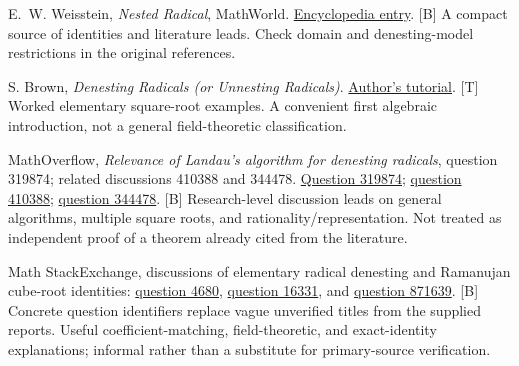 \documentclass[11pt,a4paper]{article}
\numberwithin{equation}{section}
\theoremstyle{definition}\newtheorem{definition}[theorem]{Definition}
\theoremstyle{remark}\newtheorem{remark}[theorem]{Remark}
\newcommand{\access}[2]{\href{#1}{#2}}
\newcommand{\status}[1]{\textsf{\footnotesize[#1]}}
\begin{document}
\begin{thebibliography}{99}
 E.~W. Weisstein, \emph{Nested Radical}, MathWorld.
\access{https://mathworld.wolfram.com/NestedRadical.html}{Encyclopedia entry}. \status{B}
A compact source of identities and literature leads. Check domain and denesting-model restrictions in the original references.

 S. Brown, \emph{Denesting Radicals (or Unnesting Radicals)}.
\access{https://brownmath.com/alge/nestrad.htm}{Author's tutorial}. \status{T}
Worked elementary square-root examples. A convenient first algebraic introduction, not a general field-theoretic classification.

 MathOverflow, \emph{Relevance of Landau's algorithm for denesting radicals}, question 319874; related discussions 410388 and 344478.
\access{https://mathoverflow.net/questions/319874/relevance-of-landaus-algorithm-for-denesting-radicals}{Question 319874};
\access{https://mathoverflow.net/questions/410388}{question 410388};
\access{https://mathoverflow.net/questions/344478}{question 344478}. \status{B}
Research-level discussion leads on general algorithms, multiple square roots, and rationality/representation. Not treated as independent proof of a theorem already cited from the literature.

 Math StackExchange, discussions of elementary radical denesting and Ramanujan cube-root identities:
\access{https://math.stackexchange.com/questions/4680}{question 4680},
\access{https://math.stackexchange.com/questions/16331}{question 16331}, and
\access{https://math.stackexchange.com/questions/871639}{question 871639}. \status{B}
Concrete question identifiers replace vague unverified titles from the supplied reports. Useful coefficient-matching, field-theoretic, and exact-identity explanations; informal rather than a substitute for primary-source verification.

\end{thebibliography}
\end{document}
